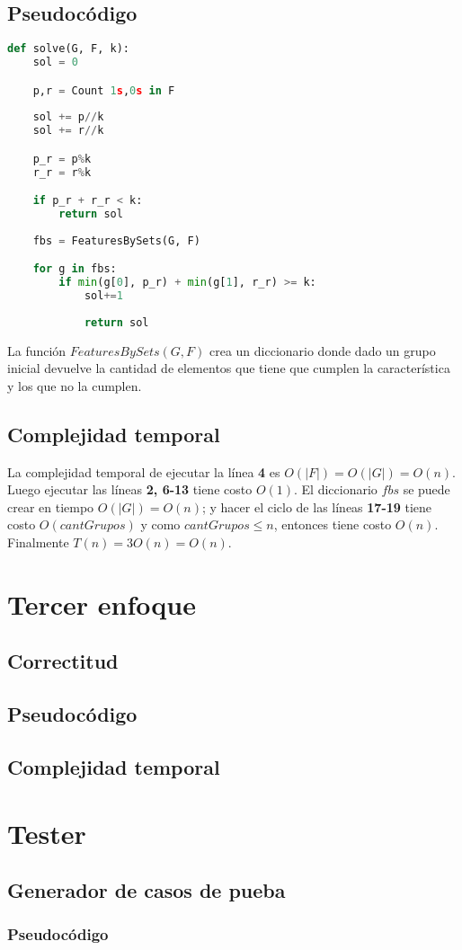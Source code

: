 \documentclass{article}
\begin{document}
\subsection*{Pseudocódigo}

\begin{lstlisting}[language = Python]
def solve(G, F, k):
    sol = 0

    p,r = Count 1s,0s in F
    
    sol += p//k
    sol += r//k

    p_r = p%k
    r_r = r%k

    if p_r + r_r < k:
        return sol
    
    fbs = FeaturesBySets(G, F)

    for g in fbs:
        if min(g[0], p_r) + min(g[1], r_r) >= k:
            sol+=1
    
            return sol

\end{lstlisting}

La función $FeaturesBySets(G, F)$ crea un diccionario donde dado un grupo inicial
devuelve la cantidad de elementos que tiene que cumplen la característica y 
los que no la cumplen.

\subsection*{Complejidad temporal}

La complejidad temporal de ejecutar la línea \textbf{4} es $O(|F|) = O(|G|) = O(n)$.
Luego ejecutar las líneas \textbf{2, 6-13} tiene costo $O(1)$. El diccionario $fbs$ se 
puede crear en tiempo $O(|G|) = O(n)$; y hacer el ciclo de las líneas \textbf{17-19} 
tiene costo $O(cantGrupos)$ y como $cantGrupos \leq n$, entonces tiene costo $O(n)$.
Finalmente $T(n) = 3O(n) = O(n)$.

\section*{Tercer enfoque}



\subsection*{Correctitud}

\subsection*{Pseudocódigo}

\subsection*{Complejidad temporal}

\section*{Tester}

\subsection*{Generador de casos de pueba}

\subsubsection*{Pseudocódigo}
\end{document}
